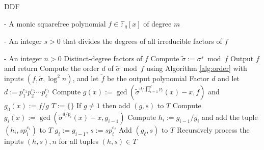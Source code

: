 \documentclass[11pt]{article}
\theoremstyle{plain}
\theoremstyle{definition}
\newcommand{\algbox}[1]{
	\begin{tcolorbox}[width = \textwidth, colback = white, arc = 2pt, boxrule = 0.5pt] 
		#1 
	\end{tcolorbox}
}
\def\F{\ensuremath{\mathbb{F}}}
\begin{document}
\begin{algorithm}[t]
	\caption{DDF}
	\label{alg:ddf}
	\centering
	\algbox{
	\begin{algorithmic}[1]
		\Require 
		\item[-] A monic squarefree polynomial $f \in \F_q[x]$ of degree $m$
		\item[-] An integer $s > 0$ that divides the degrees of all irreducible factors of $f$
		\item[-] An integer $n > 0$
		\Ensure Distinct-degree factors of $f$
		\State\label{step:sigma-s}Compute $\tilde{\sigma} := \sigma^s \bmod f$
		\If {$\tilde{\sigma} = $ id}
			\State Output $f$ and return
		\EndIf
		\State\label{step:order}Compute the order $d$ of $\tilde{\sigma} \bmod f$ using Algorithm 
		\ref{alg:order} with inputs $(f, \tilde{\sigma}, \log^2n)$, and let $\tilde{f}$ be the 
		output polynomial
		\State\label{step:factor-d}Factor $d$ and let $d := p_1^{e_1} p_2^{e_2} \cdots 
		p_\ell^{e_\ell}$
		\State\label{step:gcd-first}Compute $g(x) := \gcd(\tilde{\sigma}^{d / \prod_{i = 1}^\ell 
		p_i}(x) - x, f)$ and $g_0(x) := f / g$
		\State $T := \{\}$
		\State\label{step:proper}If $g \ne 1$ then add $(g, s)$ to $T$
		\For {$i = 1$ to $\ell$ }\label{step:for-ddf}
			\State Compute $g_i(x) := \gcd(\tilde{\sigma}^{d / p_i}(x) - x, g_{i - 1})$
			\If {$g_i \ne 1$} 
				\State Compute $h_i := g_{i - 1} / g_i$ and add the tuple $(h_i, sp_i^{e_i})$ to $T$
			\Else
				\State $g_i := g_{i - 1}$, $s := sp_i^{e_i}$
			\EndIf
		\EndFor
		\State Add $(g_\ell, s)$ to $T$
		\State Recursively process the inputs $(h, s), n$ for all tuples $(h, s) \in T$
	\end{algorithmic}}
\end{algorithm}
\end{document}

